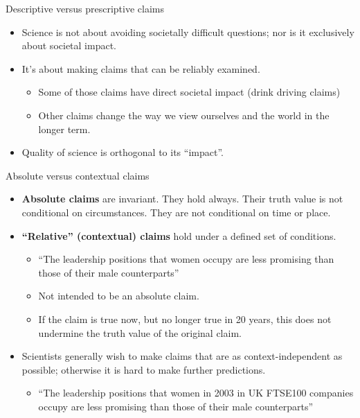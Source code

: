 \documentclass{beamer}
\begin{document}
\begin{frame}{Descriptive versus prescriptive claims}
	\begin{itemize}		
		\item Science is not about avoiding societally difficult questions; nor is it exclusively about societal impact.
		\item It's about making claims that can be reliably examined.
		\begin{itemize}
			\item Some of those claims have direct societal impact (drink driving claims)
			\item Other claims change the way we view ourselves and the world in the longer term.
		\end{itemize}
		\item Quality of science is orthogonal to its ``impact''.
	\end{itemize}
\end{frame}

\begin{frame}{Absolute versus contextual claims}
	\begin{itemize}	
		\item 	\textbf{Absolute claims} are invariant. They hold always. Their truth value is not conditional on circumstances. They are not conditional on time or place.
		\item \textbf{``Relative'' (contextual) claims} hold under a defined set of conditions.
		\begin{itemize}
			\item ``The leadership positions that women occupy are less promising than those of their male counterparts''
			\item Not intended to be an absolute claim.
			\item If the claim is true now, but no longer true in 20 years, this does not undermine the truth value of the original claim.
		\end{itemize}
		\item Scientists generally wish to make claims that are as context-independent as possible; otherwise it is hard to make further predictions.
		\begin{itemize}
			\item ``The leadership positions that women in 2003 in UK FTSE100 companies occupy are less promising than those of their male counterparts''
		\end{itemize}
	\end{itemize}
\end{frame}
\end{document}
